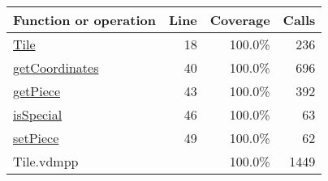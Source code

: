 \begin{longtable}{|l|r|r|r|}
\hline
Function or operation & Line & Coverage & Calls \\
\hline
\hline
\hyperref[Tile:18]{Tile} & 18&100.0\% & 236 \\
\hline
\hyperref[getCoordinates:40]{getCoordinates} & 40&100.0\% & 696 \\
\hline
\hyperref[getPiece:43]{getPiece} & 43&100.0\% & 392 \\
\hline
\hyperref[isSpecial:46]{isSpecial} & 46&100.0\% & 63 \\
\hline
\hyperref[setPiece:49]{setPiece} & 49&100.0\% & 62 \\
\hline
\hline
Tile.vdmpp & & 100.0\% & 1449 \\
\hline
\end{longtable}


